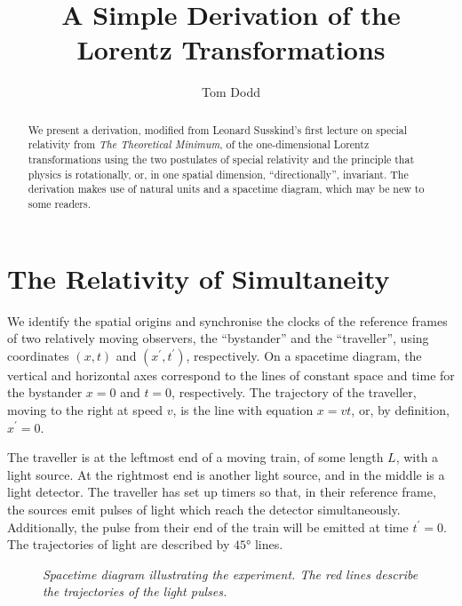 \documentclass[12pt]{article}
\title{A Simple Derivation of the\\Lorentz Transformations}
\author{Tom Dodd}
\date{}
\begin{document}
\maketitle
\vspace{-2em}

\newcommand{\binner}[2]{
    \left\langle #1, #2 \right\rangle
}

\begin{abstract}
We present a derivation, modified from Leonard Susskind's first lecture on special relativity from \textit{The Theoretical Minimum}, of the one-dimensional Lorentz transformations using the two postulates of special relativity and the principle that physics is rotationally, or, in one spatial dimension, ``directionally'', invariant. The derivation makes use of natural units and a spacetime diagram, which may be new to some readers.
\end{abstract}

\section{The Relativity of Simultaneity}

We identify the spatial origins and synchronise the clocks of the reference frames of two relatively moving observers, the ``bystander'' and the ``traveller'', using coordinates $\left(x,t\right)$ and $\left(x^\prime,t^\prime\right)$, respectively. On a spacetime diagram, the vertical and horizontal axes correspond to the lines of constant space and time for the bystander $x=0$ and $t=0$, respectively. The trajectory of the traveller, moving to the right at speed $v$, is the line with equation $x=vt$, or, by definition, $x^\prime=0$.
\newline

The traveller is at the leftmost end of a moving train, of some length $L$, with a light source. At the rightmost end is another light source, and in the middle is a light detector. The traveller has set up timers so that, in their reference frame, the sources emit pulses of light which reach the detector simultaneously. Additionally, the pulse from their end of the train will be emitted at time $t^\prime=0$. The trajectories of light are described by $\ang{45}$ lines.

\pagebreak

\begin{figure}[htbp]
\centering

\caption{\textit{Spacetime diagram illustrating the experiment. The red lines describe the trajectories of the light pulses.}}
\label{fig:LT3}
\end{figure}
\end{document}
